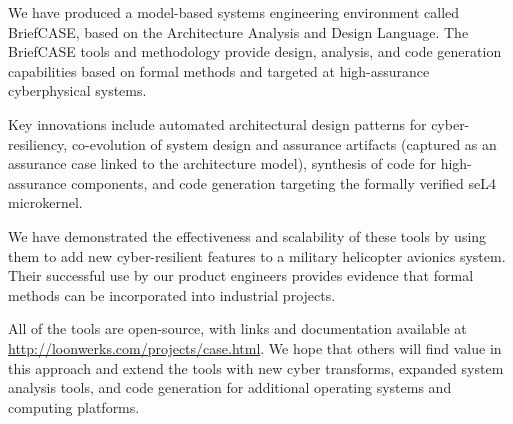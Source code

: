 We have produced a model-based systems engineering environment
called BriefCASE, based on the Architecture Analysis and Design
Language.  The BriefCASE tools and methodology provide design, analysis, and code
generation capabilities based on formal methods and targeted at
high-assurance cyberphysical systems.  

Key innovations include automated architectural design patterns 
for cyber-resiliency, co-evolution of system design and assurance 
artifacts (captured as an assurance case linked to the architecture model), 
synthesis of code for high-assurance components, and code generation
targeting the formally verified seL4 microkernel.  

We have demonstrated the effectiveness and scalability of these 
tools by using them to add new cyber-resilient features to a military 
helicopter avionics system.  Their successful use by our product engineers 
provides evidence that formal methods can be incorporated into 
industrial projects.  

All of the tools are open-source, with links and documentation available
at \url{http://loonwerks.com/projects/case.html}.  We hope that others 
will find value in this approach and extend the tools with new cyber transforms, 
expanded system analysis tools, and code generation for additional operating 
systems and computing platforms.  







%


